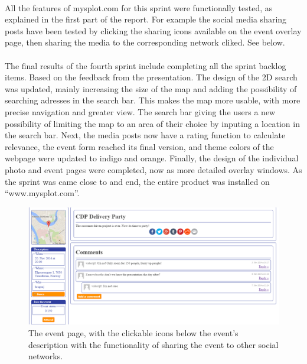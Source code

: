 \paragraph{} All the features of mysplot.com for this sprint were functionally tested, as explained in the first part of the report. For example the social media sharing posts have been tested by clicking the sharing icons available on the event overlay page, then sharing the media to the corresponding network cliked. See below. 

\paragraph{} The final results of the fourth sprint include completing all the sprint backlog items. Based on the feedback from the presentation. The design of the 2D search was updated, mainly increasing the size of the map and adding the possibility of searching adresses in the search bar. This makes the map more usable, with more precise navigation and greater view. The search bar giving the users a new possibility of limiting the map to an area of their choice by inputing a location in the search bar. Next, the media posts now have a rating function to calculate relevance, the event form reached its final version, and theme colors of the webpage were updated to indigo and orange. Finally, the design of the individual photo and event pages were completed, now as more detailed overlay windows. As the sprint was came close to and end, the entire product was installed on “www.mysplot.com”. 


\begin{figure}[ht!]
  \centering
  \includegraphics[width=\linewidth]{Sprint5/img/test1.png}
  \caption{The event page, with the clickable icons below the event's description with the functionality of sharing the event to other social networks. }
  \label{fig:S5TestMediaIconClick}
\end{figure}

